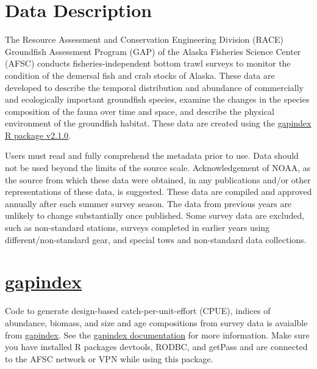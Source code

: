 \documentclass[
  letterpaper,
  oneside,
  open=any]{scrbook}
\begin{document}
\section*{Data Description}\label{data-description}


The Resource Assessment and Conservation Engineering Division (RACE)
Groundfish Assessment Program (GAP) of the Alaska Fisheries Science
Center (AFSC) conducts fisheries-independent bottom trawl surveys to
monitor the condition of the demersal fish and crab stocks of Alaska.
These data are developed to describe the temporal distribution and
abundance of commercially and ecologically important groundfish species,
examine the changes in the species composition of the fauna over time
and space, and describe the physical environment of the groundfish
habitat. These data are created using the
\href{https://afsc-gap-products.github.io/gapindex/index.html}{gapindex
R package v2.1.0}.

Users must read and fully comprehend the metadata prior to use. Data
should not be used beyond the limits of the source scale.
Acknowledgement of NOAA, as the source from which these data were
obtained, in any publications and/or other representations of these
data, is suggested. These data are compiled and approved annually after
each summer survey season. The data from previous years are unlikely to
change substantially once published. Some survey data are excluded, such
as non-standard stations, surveys completed in earlier years using
different/non-standard gear, and special tows and non-standard data
collections.

\section*{\texorpdfstring{\href{https://github.com/afsc-gap-products/gapindex}{gapindex}}{gapindex}}\label{gapindex}


Code to generate design-based catch-per-unit-effort (CPUE), indices of
abundance, biomass, and size and age compositions from survey data is
avaialble from
\href{https://github.com/afsc-gap-products/gapindex}{gapindex}. See the
\href{https://afsc-gap-products.github.io/gapindex/}{gapindex
documentation} for more information. Make sure you have installed R
packages devtools, RODBC, and getPass and are connected to the AFSC
network or VPN while using this package.
\end{document}
